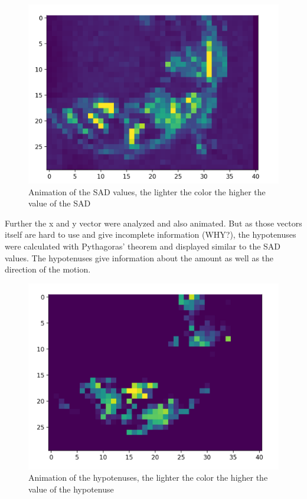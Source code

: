 \documentclass[12pt, a4paper]{report}
\begin{document}
\bigskip
\noindent
\begin{figure}
\centering
\includegraphics[scale=0.4]{Images/animation_sad.png}

\caption{Animation of the SAD values, the lighter the color the higher the value of the SAD}
\end{figure}

\bigskip
 
Further the x and y vector were analyzed and also animated. But as those vectors itself are hard to use and give incomplete information (WHY?), the hypotenuses were calculated with Pythagoras' theorem and displayed similar to the SAD values. The hypotenuses give information about the amount as well as the direction of the motion.

\bigskip
\noindent
\begin{figure}
\centering
\includegraphics[scale=0.4]{Images/animation_hypotenuse.png}

\caption{Animation of the hypotenuses, the lighter the color the higher the value of the hypotenuse}
\end{figure}
\end{document}
